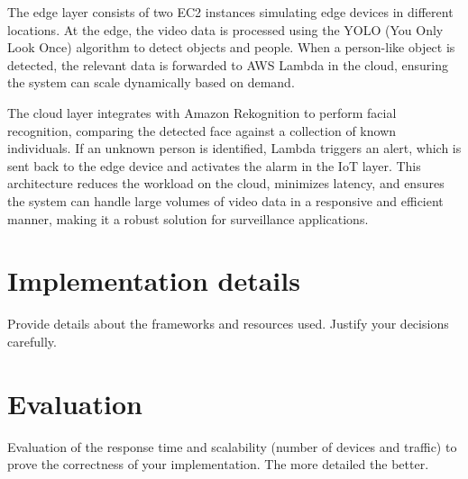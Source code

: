\documentclass[conference]{IEEEtran}
\begin{document}
The edge layer consists of two EC2 instances simulating edge devices in different locations. At the edge, the video data is processed using the YOLO (You Only Look Once) algorithm to detect objects and people. When a person-like object is detected, the relevant data is forwarded to AWS Lambda in the cloud, ensuring the system can scale dynamically based on demand.

The cloud layer integrates with Amazon Rekognition to perform facial recognition, comparing the detected face against a collection of known individuals. If an unknown person is identified, Lambda triggers an alert, which is sent back to the edge device and activates the alarm in the IoT layer. This architecture reduces the workload on the cloud, minimizes latency, and ensures the system can handle large volumes of video data in a responsive and efficient manner, making it a robust solution for surveillance applications.



\section{Implementation details}
Provide details about the frameworks and resources used. Justify your decisions carefully.

\section{Evaluation}
Evaluation of the response time and scalability (number of devices and traffic) to prove the correctness of your implementation. The more detailed the better. 
\end{document}

